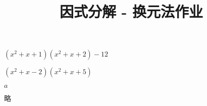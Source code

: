 \documentclass[windows,csize4]{BHCexam}
\title{因式分解 - 换元法作业}
\begin{document}
\maketitle


\begin{groups}
    \begin{questions}[]

        \question[5] $(x^2+x+1)(x^2+x+2)-12$
        \begin{solution}{0.5cm}
            \methodonly $(x^2+x-2)(x^2+x+5)$
        \end{solution}
        \vspace{3.5cm}






        
        \question[5] $a$
        \begin{solution}{0.5cm}
            \methodonly $略$
        \end{solution}
        \vspace{3.5cm}


    \end{questions}

\end{groups}






\label{lastpage}
\end{document}

